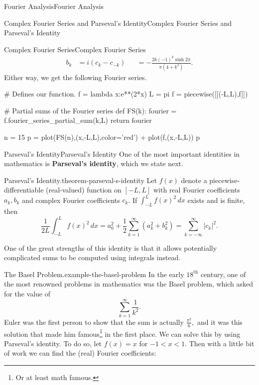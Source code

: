 \documentclass[10pt,]{book}
\newcommand{\terminology}[1]{\textbf{#1}}
\numberwithin{equation}{section}
\begin{document}
\begin{chapterptx}{Fourier Analysis}{}{Fourier Analysis}{}{}
\begin{sectionptx}{Complex Fourier Series and Parseval's Identity}{}{Complex Fourier Series and Parseval's Identity}{}{}
\begin{subsectionptx}{Complex Fourier Series}{}{Complex Fourier Series}{}{}
\begin{align*}
b_{k} & = i(c_{k}-c_{-k}) & &= -\frac{2k(-1)^{k}\sinh2\pi}{\pi(4+k^{2})}. 
\end{align*}
Either way, we get the following Fourier series.%
\begin{sageinput}
# Defines our function.
f = lambda x:e**(2*x)
L = pi
f = piecewise([[(-L,L),f]])

# Partial sums of the Fourier series
def FS(k):
fourier = f.fourier_series_partial_sum(k,L)
return fourier

n = 15
p = plot(FS(n),(x,-L,L),color='red') + plot(f,(x,-L,L))
p
\end{sageinput}
\end{subsectionptx}
%
%
\typeout{************************************************}
\typeout{************************************************}
%
\begin{subsectionptx}{Parseval's Identity}{}{Parseval's Identity}{}{}\label{subsection-parseval-s-identity}
\hypertarget{p-416}{}%
One of the most important identities in mathematics is \terminology{Parseval's identity}, which we state next.%
\begin{theorem}{Parseval's Identity.}{}{theorem-parseval-s-identity}%
\hypertarget{p-417}{}%
Let \(f(x)\) denote a piecewise-differentiable (real-valued) function on \([-L,L]\) with real Fourier coefficients \(a_{k},b_{k}\) and complex Fourier coefficients \(c_{k}\). If \(\int_{-L}^{L}f(x)^{2}\,dx\) exists and is finite, then%
\begin{equation*}
\frac{1}{2L}\int_{-L}^{L}f(x)^{2}\,dx = a^{2}_{0} + \frac{1}{2}\sum_{k=1}^{\infty}(a^{2}_{k}+b^{2}_{k}) = \sum_{k=-\infty}^{\infty}|c_{k}|^{2}.
\end{equation*}
%
\end{theorem}
\hypertarget{p-418}{}%
One of the great strengths of this identity is that it allows potentially complicated sums to be computed using integrals instead.%
\begin{example}{The Basel Problem.}{example-the-basel-problem}%
\hypertarget{p-419}{}%
In the early \(18^{\text{th}}\) century, one of the most renowned problems in mathematics was the Basel problem, which asked for the value of%
\begin{equation*}
\sum_{k=1}^{\infty}\frac{1}{k^{2}}.
\end{equation*}
Euler was the first person to show that the sum is actually \(\frac{\pi^{2}}{6},\) and it was this solution that made him famous\footnote{Or at least math famous.\label{fn-7}} in the first place. We can solve this by using Parseval's identity. To do so, let \(f(x) = x\) for \(-1< x < 1\). Then with a little bit of work we can find the (real) Fourier coefficients:%

\end{example}
\end{subsectionptx}
\end{sectionptx}
\end{chapterptx}
\end{document}
